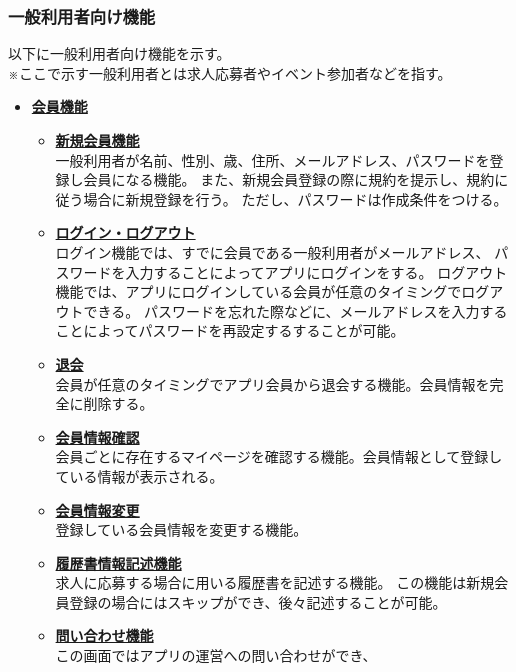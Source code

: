 \documentclass[a4paper,dvipdfmx]{jarticle}
\begin{document}
\subsubsection{一般利用者向け機能}
以下に一般利用者向け機能を示す。\\
※ここで示す一般利用者とは求人応募者やイベント参加者などを指す。
\begin{itemize}
    \item \underline{\textbf{会員機能}}
          \begin{itemize}
              \item[-] \underline{\textbf{新規会員機能}}\\
                  一般利用者が名前、性別、歳、住所、メールアドレス、パスワードを登録し会員になる機能。
                  また、新規会員登録の際に規約を提示し、規約に従う場合に新規登録を行う。
                  ただし、パスワードは作成条件をつける。
              \item[-] \underline{\textbf{ログイン・ログアウト}}\\
                  ログイン機能では、すでに会員である一般利用者がメールアドレス、
                  パスワードを入力することによってアプリにログインをする。
                  ログアウト機能では、アプリにログインしている会員が任意のタイミングでログアウトできる。
                  パスワードを忘れた際などに、メールアドレスを入力することによってパスワードを再設定するすることが可能。
              \item[-] \underline{\textbf{退会}}\\
                  会員が任意のタイミングでアプリ会員から退会する機能。会員情報を完全に削除する。
              \item[-] \underline{\textbf{会員情報確認}}\\
                  会員ごとに存在するマイページを確認する機能。会員情報として登録している情報が表示される。
              \item[-] \underline{\textbf{会員情報変更}}\\
                  登録している会員情報を変更する機能。
              \item[-] \underline{\textbf{履歴書情報記述機能}}\\
                  求人に応募する場合に用いる履歴書を記述する機能。
                  この機能は新規会員登録の場合にはスキップができ、後々記述することが可能。
              \item[-] \underline{\textbf{問い合わせ機能}}\\
                  この画面ではアプリの運営への問い合わせができ、

\end{itemize}
\end{itemize}
\end{document}
